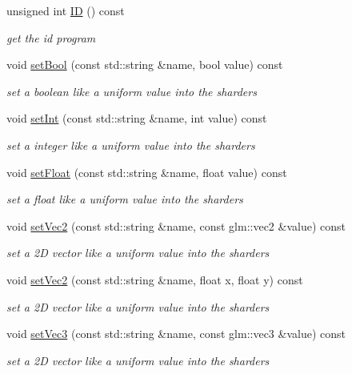 \begin{DoxyCompactItemize}
unsigned int \mbox{\hyperlink{class_shader_a23a569879e4ede84a052c0d3a12ae3c0}{ID}} () const
\begin{DoxyCompactList}\small\item\em get the id program \end{DoxyCompactList}\item 
void \mbox{\hyperlink{class_shader_ab1a56d6c299bd7eaa18c2e142ef7bd9f}{set\+Bool}} (const std\+::string \&name, bool value) const
\begin{DoxyCompactList}\small\item\em set a boolean like a uniform value into the sharders \end{DoxyCompactList}\item 
void \mbox{\hyperlink{class_shader_ad362e2b654cd95a3574cd505411e41fd}{set\+Int}} (const std\+::string \&name, int value) const
\begin{DoxyCompactList}\small\item\em set a integer like a uniform value into the sharders \end{DoxyCompactList}\item 
void \mbox{\hyperlink{class_shader_afe7367621f74c2d26431d8ac15252bf3}{set\+Float}} (const std\+::string \&name, float value) const
\begin{DoxyCompactList}\small\item\em set a float like a uniform value into the sharders \end{DoxyCompactList}\item 
void \mbox{\hyperlink{class_shader_afd4d41322a1cdd1d5155bf124d19debf}{set\+Vec2}} (const std\+::string \&name, const glm\+::vec2 \&value) const
\begin{DoxyCompactList}\small\item\em set a 2D vector like a uniform value into the sharders \end{DoxyCompactList}\item 
void \mbox{\hyperlink{class_shader_afb91bc9e954bf590857c96ab1331b0ec}{set\+Vec2}} (const std\+::string \&name, float x, float y) const
\begin{DoxyCompactList}\small\item\em set a 2D vector like a uniform value into the sharders \end{DoxyCompactList}\item 
void \mbox{\hyperlink{class_shader_aeb021061c5d451329d92257b07dbfec3}{set\+Vec3}} (const std\+::string \&name, const glm\+::vec3 \&value) const
\begin{DoxyCompactList}\small\item\em set a 2D vector like a uniform value into the sharders \end{DoxyCompactList}\item 

\end{DoxyCompactItemize}
